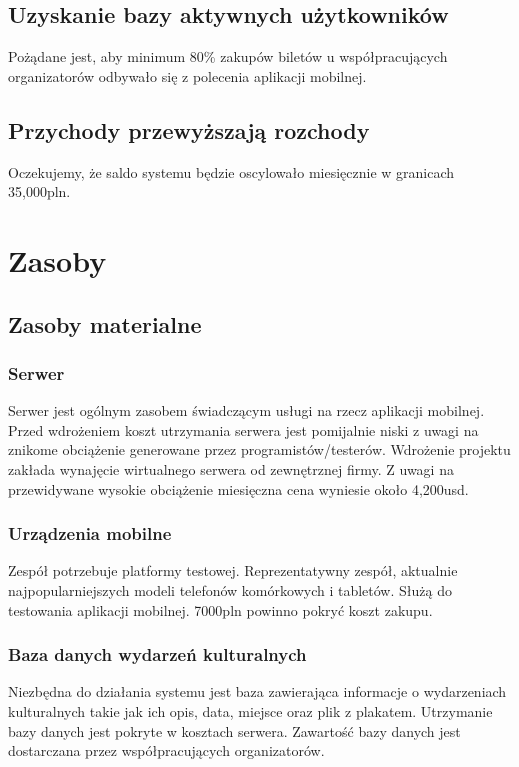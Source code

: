 \documentclass[10pt]{dokument-ppi}
\begin{document}
\subsection{Uzyskanie bazy aktywnych użytkowników}
Pożądane jest, aby minimum 80\% zakupów biletów u współpracujących organizatorów
odbywało się z polecenia aplikacji mobilnej.

\subsection{Przychody przewyższają rozchody}
Oczekujemy, że saldo systemu będzie oscylowało miesięcznie w granicach
35,000pln.


\section{Zasoby}

\subsection{Zasoby materialne}

\subsubsection{Serwer}
Serwer jest ogólnym zasobem świadczącym usługi na rzecz aplikacji mobilnej.
Przed wdrożeniem koszt utrzymania serwera jest pomijalnie niski z uwagi na
znikome obciążenie generowane przez programistów/testerów. Wdrożenie projektu
zakłada wynajęcie wirtualnego serwera od zewnętrznej firmy. Z uwagi na
przewidywane wysokie obciążenie miesięczna cena wyniesie około 4,200usd.

\subsubsection{Urządzenia mobilne}
Zespół potrzebuje platformy testowej. Reprezentatywny zespół, aktualnie
najpopularniejszych modeli telefonów komórkowych i tabletów. Służą do testowania
aplikacji mobilnej. 7000pln powinno pokryć koszt zakupu.

\subsubsection{Baza danych wydarzeń kulturalnych}
Niezbędna do działania systemu jest baza zawierająca informacje o wydarzeniach
kulturalnych takie jak ich opis, data, miejsce oraz plik z plakatem. Utrzymanie
bazy danych jest pokryte w kosztach serwera. Zawartość bazy danych jest
dostarczana przez współpracujących organizatorów.
\end{document}
